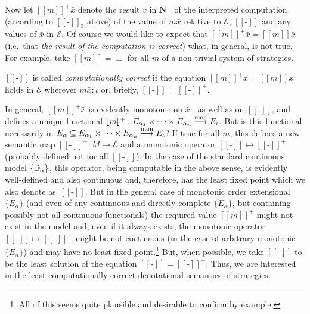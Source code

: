 \documentclass[fleqn]{LMCS}
\theoremstyle{plain}\newtheorem{satz}[thm]{Satz}
\theoremstyle{plain}\newtheorem{hyp}[thm]{Hypothesis}
\theoremstyle{plain}\newtheorem{hyps}[thm]{Hypotheses}
\theoremstyle{definition}\newtheorem{note}[thm]{Note}
\newcommand{\EE}{\mathcal{E}}
\newcommand{\defis}{\mbox{-}}
\newcommand{\setof}[1]{\{#1\}}
\newcommand{\arr}{\rightarrow}
\newcommand{\arrr}{\longrightarrow}
\newcommand{\Dsem}[1]{[\![ #1 ]\!]}
\newcommand{\NN}{\mathbf{N}}
\newcommand{\Undef}{{\perp}}
\newcommand{\bx}{\bar{x}}
\newcommand{\?}{\mbox{?}}
\begin{document}
Now let $\Dsem{m}^+\bx$ denote 
the result $v$ in $\NN_\Undef$ of the interpreted 
computation (according to $\Dsem{\defis}_3$ above) 
of the value of $m\bx$ 
relative to $\EE$, $\Dsem{\defis}$ and any values of $\bx$ in $\EE$. 
Of course we would like to expect that $\Dsem{m}^+\bx=\Dsem{m}\bx$ 
(i.e.\ that \emph{the result of the computation is correct}) 
what, in general, 
is not true. For example, take $\Dsem{m}=\Undef$ for all $m$ of a non-trivial 
system of strategies. 
\begin{defi}$\Dsem{\defis}$ is called \emph{computationally correct} if 
the equation $\Dsem{m}^+\bx=\Dsem{m}\bx$ holds in $\EE$ wherever $m\bx:\iota$ 
or, briefly, $\Dsem{\defis}=\Dsem{\defis}^+$. 
\end{defi}
In general, $\Dsem{m}^+\bx$
is evidently monotonic on $\bx$ 
\label{page:monotonic}, as well as on $\Dsem{\defis}$, 
and defines 
a unique functional 
$\Dsem{m}^+:E_{\alpha_1}\times\cdots\times E_{\alpha_n}\stackrel{\rm mon}{\arrr} E_{\iota}$. 
But is this functional necessarily in 
$E_{\alpha}\subseteq E_{\alpha_1}\times\cdots\times E_{\alpha_n}\stackrel{\rm mon}{\arrr} E_{\iota}$?
If true for all $m$, this defines a new semantic map 
$\Dsem{\defis}^+:M\arr\EE$ and 
a monotonic operator \mbox{$\Dsem{\defis}\mapsto\Dsem{\defis}^+$} 
(probably defined not for all $\Dsem{\defis}$). 
In the case of the standard 
continuous model $\setof{\bbD_\alpha}$, this operator, 
being computable in the above sense, is evidently 
well-defined and also continuous 
and, therefore, has the least fixed point which we 
also denote as~$\Dsem{\defis}$. 
But in the general case of monotonic 
order extensional $\setof{E_\alpha}$ (and even of any continuous 
and directly complete 
$\setof{E_\alpha}$, but containing possibly not all continuous functionals)
the required value $\Dsem{m}^+$ might not exist in the model
and, even if 
it always exists, the 
monotonic operator $\Dsem{\defis}\mapsto\Dsem{\defis}^+$ 
might be not continuous (in the case of arbitrary monotonic 
$\setof{E_{\alpha}}$) and may have no least fixed point.\footnote{All of this seems quite plausible and desirable to confirm by example.}
But, when possible, we 
take $\Dsem{\defis}$ to be the least solution of the 
equation $\Dsem{\defis}=\Dsem{\defis}^+$. 
Thus, we are interested in the least computationally correct 
denotational semantics of strategies. 
\end{document}
